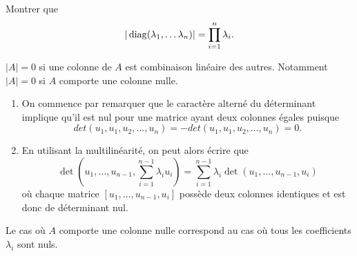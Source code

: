 \begin{exercise*}
  Montrer que 
  \begin{equation} \label{eq:determiantMatriceDiagonale}
    |\operatorname{diag}(\lambda_1, \dots \lambda_n)| = \prod_{i = 1}^n \lambda_i.
  \end{equation}
\end{exercise*}

\begin{lemma} \label{lem:determinantNul}
  $|A| = 0$ si une colonne de $A$ est combinaison linéaire des autres.
  Notamment $|A| = 0$ si $A$ comporte une colonne nulle.
\end{lemma}

\proof 
\begin{enumerate}
\item On commence par remarquer que le caractère alterné du déterminant implique qu'il est nul pour une matrice ayant deux colonnes égales puisque
$$
det(u_1, u_1, u_2,\dots, u_n) = -det(u_1, u_1, u_2,\dots, u_n) = 0.
$$
\item En utilisant la multilinéarité, on peut alors écrire que 
$$
\det\left(u_1, \dots, u_{n-1}, \sum_{i=1}^{n-1} \lambda_i u_i\right)
= \sum_{i=1}^{n-1} \lambda_i \det\left(u_1, \dots, u_{n-1}, u_i\right)
$$
où chaque matrice $\left[u_1, \dots, u_{n-1}, u_i\right]$ possède deux colonnes identiques et est donc de déterminant nul.
\end{enumerate}
Le cas où $A$ comporte une colonne nulle correspond au cas où tous les coefficients $\lambda_i$ sont nuls.
\eproof

